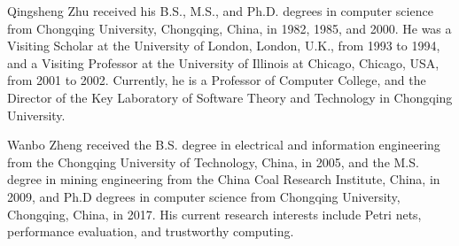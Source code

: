 \documentclass[journal]{IEEEtran}
\begin{document}
\begin{IEEEbiography}{Qingsheng Zhu}
received his B.S., M.S., and Ph.D. degrees in computer science from Chongqing University, Chongqing, China, in 1982, 1985, and 2000. He was a Visiting Scholar at the University of London, London, U.K., from 1993 to 1994, and a Visiting Professor at the University of Illinois at Chicago, Chicago, USA, from 2001 to 2002. Currently, he is a Professor of Computer College, and the Director of the Key Laboratory of Software Theory and Technology in Chongqing University.
\end{IEEEbiography}

\begin{IEEEbiography}{Wanbo Zheng}
received the B.S. degree in electrical and information engineering from the Chongqing University of Technology, China, in 2005, and the M.S. degree in mining engineering from the China Coal Research Institute, China, in 2009, and Ph.D degrees in computer science from Chongqing University, Chongqing, China, in 2017. His current research interests include Petri nets, performance evaluation, and trustworthy computing.
\end{IEEEbiography}

\vfill
\end{document}
